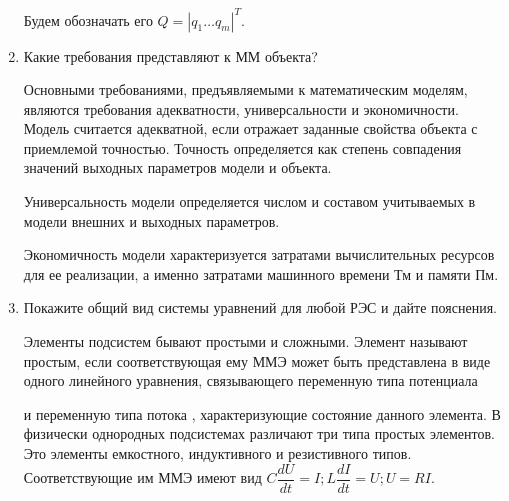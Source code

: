 \documentclass[a4paper,14pt]{article}
\begin{document}
\begin{enumerate}
Будем обозначать его $Q = |q_1…q_m|^T$.

\item	Какие требования представляют к ММ объекта?


Основными требованиями, предъявляемыми к математическим моделям, являются требования адекватности, универсальности и экономичности. Модель считается адекватной, если отражает заданные свойства объекта с приемлемой точностью. Точность определяется как степень совпадения значений выходных параметров модели и объекта.

Универсальность модели определяется числом и составом учитываемых в модели внешних и выходных параметров.

Экономичность модели характеризуется затратами вычислительных ресурсов для ее реализации, а именно затратами машинного времени Тм и памяти Пм.

\item	Покажите общий вид системы уравнений для любой РЭС и дайте пояснения.

Элементы подсистем бывают простыми и сложными. Элемент называют простым, если соответствующая ему ММЭ может быть представлена в виде одного линейного уравнения, связывающего переменную типа потенциала  

и	переменную типа потока  , характеризующие состояние данного элемента. В физически однородных подсистемах различают три типа простых элементов. Это элементы емкостного, индуктивного и резистивного типов. Соответствующие им ММЭ имеют вид $C\dfrac{dU}{dt} = I; L\dfrac{dI}{dt} = U; U = RI$.
\end{enumerate}
\end{document}
